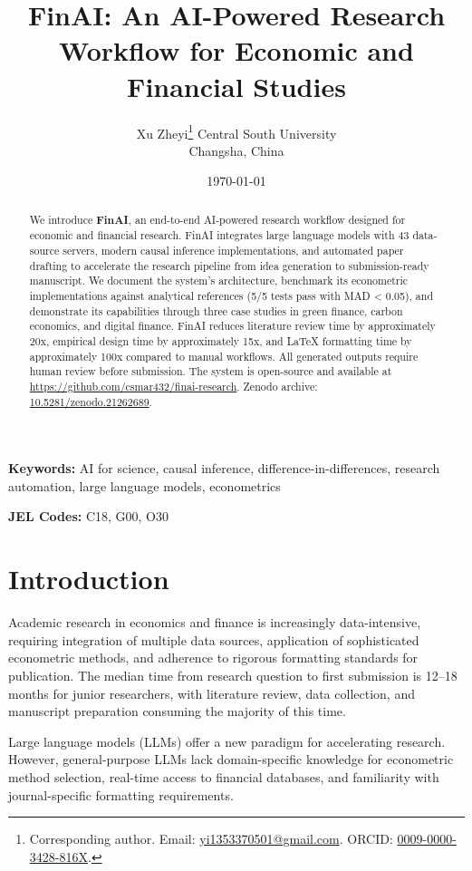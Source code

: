 \documentclass[12pt, a4paper]{article}
\title{\textbf{FinAI: An AI-Powered Research Workflow for Economic and Financial Studies}}
\author{%
    Xu Zheyi\thanks{Corresponding author. Email: \href{mailto:yi1353370501@gmail.com}{yi1353370501@gmail.com}. ORCID: \href{https://orcid.org/0009-0000-3428-816X}{0009-0000-3428-816X}.}%
    \quad
    Central South University\\
    Changsha, China
}
\date{\today}
\begin{document}
\maketitle

\begin{abstract}
We introduce \textbf{FinAI}, an end-to-end AI-powered research workflow designed for economic and financial research. FinAI integrates large language models with 43 data-source servers, modern causal inference implementations, and automated paper drafting to accelerate the research pipeline from idea generation to submission-ready manuscript. We document the system's architecture, benchmark its econometric implementations against analytical references (5/5 tests pass with MAD < 0.05), and demonstrate its capabilities through three case studies in green finance, carbon economics, and digital finance. FinAI reduces literature review time by approximately 20x, empirical design time by approximately 15x, and LaTeX formatting time by approximately 100x compared to manual workflows. All generated outputs require human review before submission. The system is open-source and available at \url{https://github.com/csmar432/finai-research}. Zenodo archive: \href{https://doi.org/10.5281/zenodo.21262689}{10.5281/zenodo.21262689}.
\end{abstract}

\textbf{Keywords:} AI for science, causal inference, difference-in-differences, research automation, large language models, econometrics

\textbf{JEL Codes:} C18, G00, O30

\newpage

\section{Introduction}

Academic research in economics and finance is increasingly data-intensive, requiring integration of multiple data sources, application of sophisticated econometric methods, and adherence to rigorous formatting standards for publication. The median time from research question to first submission is 12--18 months for junior researchers, with literature review, data collection, and manuscript preparation consuming the majority of this time.

Large language models (LLMs) offer a new paradigm for accelerating research. However, general-purpose LLMs lack domain-specific knowledge for econometric method selection, real-time access to financial databases, and familiarity with journal-specific formatting requirements.
\end{document}
